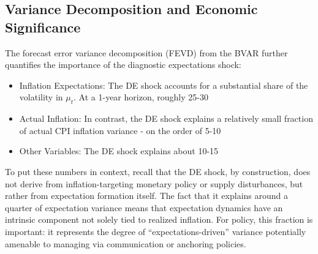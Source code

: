 \documentclass[12pt]{article}
\begin{document}
\subsection{Variance Decomposition and Economic Significance}
The forecast error variance decomposition (FEVD) from the BVAR further quantifies the importance of the diagnostic expectations shock:
\begin{itemize}
    \item Inflation Expectations: The DE shock accounts for a substantial share of the volatility in $\mu_t$. At a 1-year horizon, roughly 25-30%
    \item Actual Inflation: In contrast, the DE shock explains a relatively small fraction of actual CPI inflation variance - on the order of 5-10%
    \item Other Variables: The DE shock explains about 10-15%
\end{itemize}

To put these numbers in context, recall that the DE shock, by construction, does not derive from inflation-targeting monetary policy or supply disturbances, but rather from expectation formation itself. The fact that it explains around a quarter of expectation variance means that expectation dynamics have an intrinsic component not solely tied to realized inflation. For policy, this fraction is important: it represents the degree of “expectations-driven” variance potentially amenable to managing via communication or anchoring policies.
\end{document}

